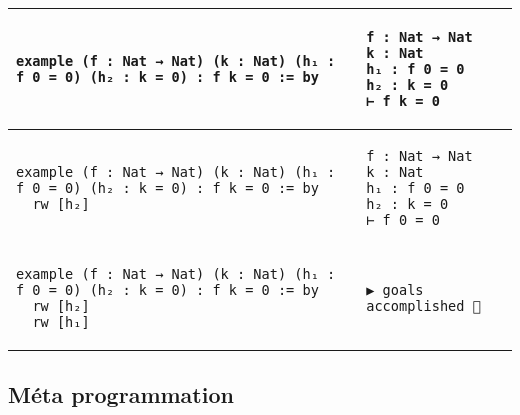 \documentclass[a4paper, 12pt]{article}
\begin{document}
\vspace{\baselineskip}
\begin{tabular}{m{} | m{}}
    \begin{minipage}[t]{0.65\textwidth}
    \begin{verbatim}
example (f : Nat → Nat) (k : Nat) (h₁ : f 0 = 0) (h₂ : k = 0) : f k = 0 := by
    \end{verbatim}
    \end{minipage}
    &
    \begin{minipage}[t]{0.35\textwidth}
    \begin{verbatim}
f : Nat → Nat
k : Nat
h₁ : f 0 = 0
h₂ : k = 0
⊢ f k = 0
    \end{verbatim}
    \end{minipage}
    \\\hline
    \begin{minipage}[t]{0.65\textwidth}
    \begin{verbatim}
example (f : Nat → Nat) (k : Nat) (h₁ : f 0 = 0) (h₂ : k = 0) : f k = 0 := by
  rw [h₂]
    \end{verbatim}
    \end{minipage}
    &
    \begin{minipage}[t]{0.35\textwidth}
    \begin{verbatim}
f : Nat → Nat
k : Nat
h₁ : f 0 = 0
h₂ : k = 0
⊢ f 0 = 0
    \end{verbatim}
    \end{minipage}
    \\\hline
    \begin{minipage}[t]{0.65\textwidth}
    \begin{verbatim}
example (f : Nat → Nat) (k : Nat) (h₁ : f 0 = 0) (h₂ : k = 0) : f k = 0 := by
  rw [h₂]
  rw [h₁]
    \end{verbatim}
    \end{minipage}
    &
    \begin{minipage}[t]{0.35\textwidth}
    \begin{verbatim}
▶ goals accomplished 🎉
    \end{verbatim}
    \end{minipage}
\end{tabular}
\vspace{\baselineskip}

\subsection{Méta programmation}
\end{document}
